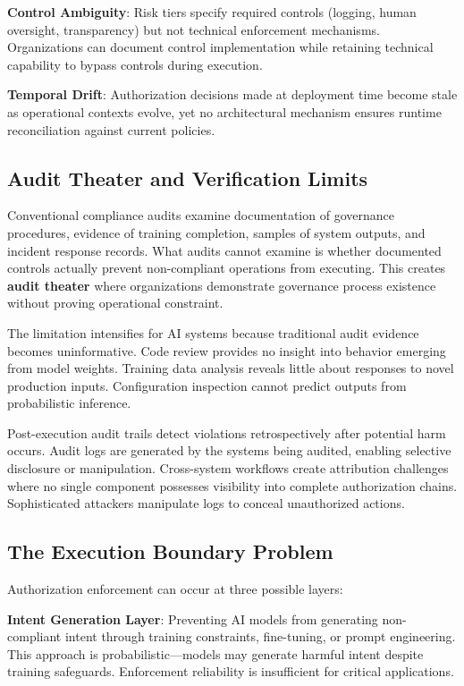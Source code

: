 \documentclass[11pt,letterpaper]{article}
\begin{document}
\textbf{Control Ambiguity}: Risk tiers specify required controls (logging, human oversight, transparency) but not technical enforcement mechanisms. Organizations can document control implementation while retaining technical capability to bypass controls during execution.

\textbf{Temporal Drift}: Authorization decisions made at deployment time become stale as operational contexts evolve, yet no architectural mechanism ensures runtime reconciliation against current policies.

\subsection{Audit Theater and Verification Limits}

Conventional compliance audits examine documentation of governance procedures, evidence of training completion, samples of system outputs, and incident response records. What audits cannot examine is whether documented controls actually prevent non-compliant operations from executing. This creates \textbf{audit theater} where organizations demonstrate governance process existence without proving operational constraint.

The limitation intensifies for AI systems because traditional audit evidence becomes uninformative. Code review provides no insight into behavior emerging from model weights. Training data analysis reveals little about responses to novel production inputs. Configuration inspection cannot predict outputs from probabilistic inference.

Post-execution audit trails detect violations retrospectively after potential harm occurs. Audit logs are generated by the systems being audited, enabling selective disclosure or manipulation. Cross-system workflows create attribution challenges where no single component possesses visibility into complete authorization chains. Sophisticated attackers manipulate logs to conceal unauthorized actions.

\subsection{The Execution Boundary Problem}

Authorization enforcement can occur at three possible layers:

\textbf{Intent Generation Layer}: Preventing AI models from generating non-compliant intent through training constraints, fine-tuning, or prompt engineering. This approach is probabilistic---models may generate harmful intent despite training safeguards. Enforcement reliability is insufficient for critical applications.
\end{document}
